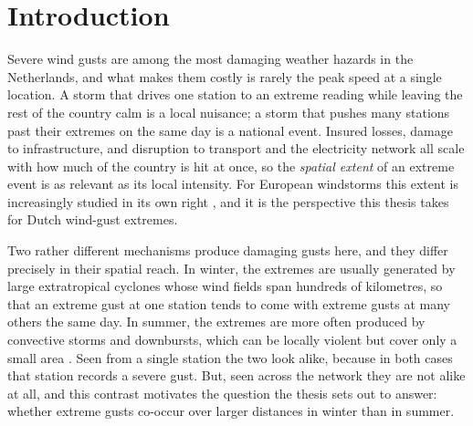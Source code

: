 %
%
%
\section{Introduction}\label{sec:introduction}

Severe wind gusts are among the most damaging weather hazards in the Netherlands, and what makes them costly is rarely the peak speed at a single location. A storm that drives one station to an extreme reading while leaving the rest of the country calm is a local nuisance; a storm that pushes many stations past their extremes on the same day is a national event. Insured losses, damage to infrastructure, and disruption to transport and the electricity network all scale with how much of the country is hit at once, so the \emph{spatial extent} of an extreme event is as relevant as its local intensity. For European windstorms this extent is increasingly studied in its own right \citep{sharkey2020}, and it is the perspective this thesis takes for Dutch wind-gust extremes.

Two rather different mechanisms produce damaging gusts here, and they differ precisely in their spatial reach. In winter, the extremes are usually generated by large extratropical cyclones whose wind fields span hundreds of kilometres, so that an extreme gust at one station tends to come with extreme gusts at many others the same day. In summer, the extremes are more often produced by convective storms and downbursts, which can be locally violent but cover only a small area \citep{pacey2021,gliksman2023european}. Seen from a single station the two look alike, because in both cases that station records a severe gust. But, seen across the network they are not alike at all, and this contrast motivates the question the thesis sets out to answer: whether extreme gusts co-occur over larger distances in winter than in summer.

